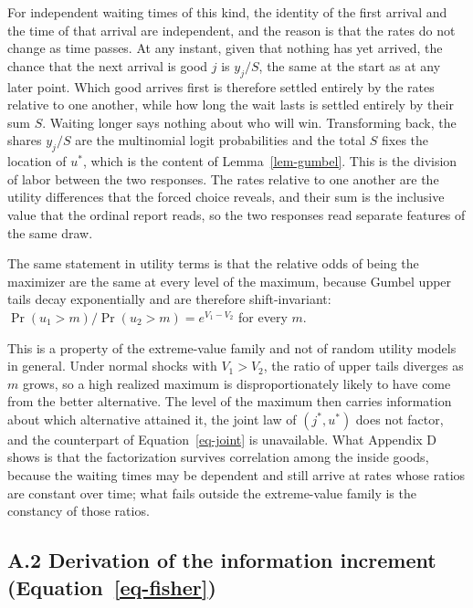 \documentclass[
  letterpaper,
  DIV=11,
  numbers=noendperiod]{scrartcl}
\theoremstyle{plain}
\theoremstyle{plain}
\theoremstyle{remark}
\begin{document}
For independent waiting times of this kind, the identity of the first
arrival and the time of that arrival are independent, and the reason is
that the rates do not change as time passes. At any instant, given that
nothing has yet arrived, the chance that the next arrival is good \(j\)
is \(y_j / S\), the same at the start as at any later point. Which good
arrives first is therefore settled entirely by the rates relative to one
another, while how long the wait lasts is settled entirely by their sum
\(S\). Waiting longer says nothing about who will win. Transforming
back, the shares \(y_j / S\) are the multinomial logit probabilities and
the total \(S\) fixes the location of \(u^*\), which is the content of
Lemma~\ref{lem-gumbel}. This is the division of labor between the two
responses. The rates relative to one another are the utility differences
that the forced choice reveals, and their sum is the inclusive value
that the ordinal report reads, so the two responses read separate
features of the same draw.

The same statement in utility terms is that the relative odds of being
the maximizer are the same at every level of the maximum, because Gumbel
upper tails decay exponentially and are therefore shift-invariant:
\(\Pr(u_1 > m) / \Pr(u_2 > m) = e^{V_1 - V_2}\) for every \(m\).

This is a property of the extreme-value family and not of random utility
models in general. Under normal shocks with \(V_1 > V_2\), the ratio of
upper tails diverges as \(m\) grows, so a high realized maximum is
disproportionately likely to have come from the better alternative. The
level of the maximum then carries information about which alternative
attained it, the joint law of \(\left( j^*, u^* \right)\) does not
factor, and the counterpart of Equation~\ref{eq-joint} is unavailable.
What Appendix D shows is that the factorization survives correlation
among the inside goods, because the waiting times may be dependent and
still arrive at rates whose ratios are constant over time; what fails
outside the extreme-value family is the constancy of those ratios.

\subsection*{\texorpdfstring{A.2 Derivation of the information increment
(Equation~\ref{eq-fisher})}{A.2 Derivation of the information increment (Equation~)}}\label{a.2-derivation-of-the-information-increment-eq-fisher}
\end{document}
